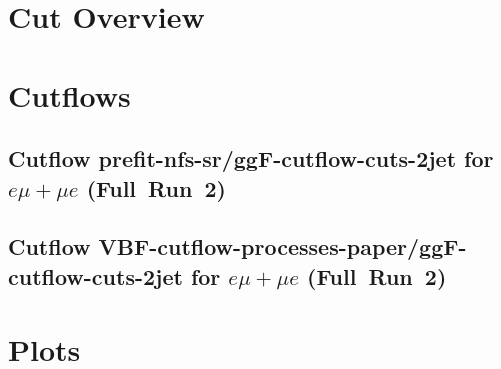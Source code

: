 \documentclass{article}
\begin{document}
\section[Cut Overview]{Cut Overview}

\centering


\section[Cutflows]{Cutflows}

\centering

\subsection[Cutflow prefit-nfs-sr/ggF-cutflow-cuts-2jet for \ensuremath{e\mu+\mu{}e} (Full~Run~2)]{Cutflow prefit-nfs-sr/ggF-cutflow-cuts-2jet for \ensuremath{e\mu+\mu{}e} (Full~Run~2)}

\centering


\subsection[Cutflow VBF-cutflow-processes-paper/ggF-cutflow-cuts-2jet for \ensuremath{e\mu+\mu{}e} (Full~Run~2)]{Cutflow VBF-cutflow-processes-paper/ggF-cutflow-cuts-2jet for \ensuremath{e\mu+\mu{}e} (Full~Run~2)}

\centering


\section[Plots]{Plots}

\centering
\end{document}
